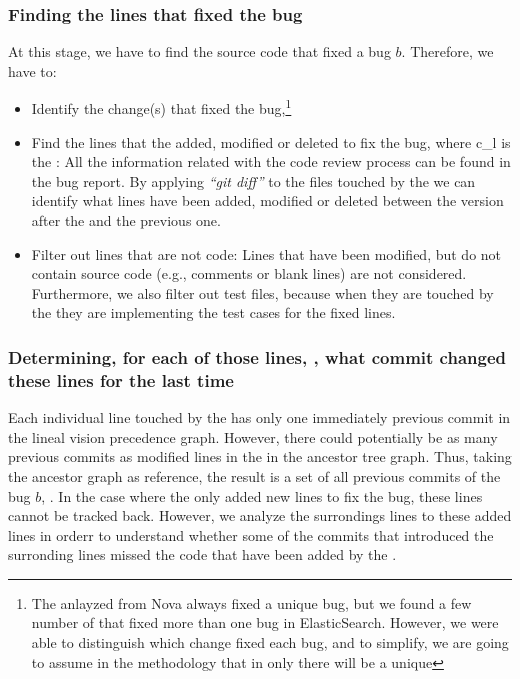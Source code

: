 \documentclass[a4paper, 12pt]{book}
\begin{document}
\subsubsection{Finding the lines that fixed the bug}
At this stage, we have to find the source code that fixed a bug $b$. Therefore, we have to:
	\begin{itemize}
		\item Identify the change(s) that fixed the bug,\footnote{ The anlayzed \BFC from Nova always fixed a unique bug, but we found a few number of \BFC that fixed more than one bug in ElasticSearch. However, we were able to distinguish which change fixed each bug, and to simplify, we are going to assume in the methodology that in  only there will be a unique \BFC}
		\item Find the lines that the  added, modified or deleted to fix the bug,  where c\_l is the \BFC:
	All the information related with the code review process can be found in the bug report. By applying \textit{``git diff''} to the files touched by the \BFC we can identify what lines have been added, modified or deleted between the version after the  and the previous one.
		\item Filter out lines that are not code:
		Lines that have been modified, but do not contain source code (e.g., comments or blank lines) are not considered. Furthermore, we also filter out test files, because when they are touched by the  they are implementing the test cases for the fixed lines.
	\end{itemize}

\subsubsection{Determining, for each of those lines, , what commit changed these lines for the last time}
Each individual line touched by the \BFC has only one immediately previous commit in the lineal vision precedence graph. However, there could potentially be as many previous commits as modified lines in the \BFC in the ancestor tree graph. Thus, taking the ancestor graph as reference,  the result is a set of all previous commits of the bug $b$, .
In the case where the \BFC only added new lines to fix the bug, these lines cannot be tracked back. However, we analyze the surrondings lines to these added lines in orderr to understand whether some of the commits that introduced the surronding lines missed the code that have been added by the \BFC.
\end{document}
